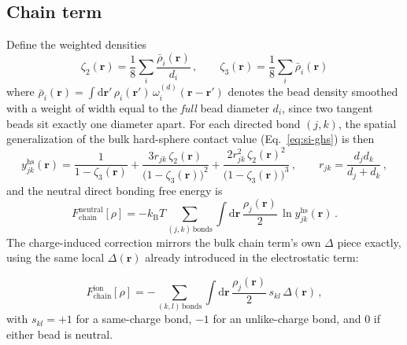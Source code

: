 \documentclass[journal=macl,manuscript=suppinfo,layout=onecolumn]{achemso}
\begin{document}
\subsection{Chain term}
\label{si:chain}
Define the weighted densities
\begin{equation}
    \zeta_2(\mathbf{r}) = \frac{1}{8}\sum_i \frac{\bar\rho_i(\mathbf{r})}{d_i}\,,\qquad
    \zeta_3(\mathbf{r}) = \frac{1}{8}\sum_i \bar\rho_i(\mathbf{r})
    \label{eq:si-zeta}
\end{equation}
where $\bar\rho_i(\mathbf{r})=\int\!\mathrm{d}\mathbf{r}'\,\rho_i(\mathbf{r}')\,\omega_i^{(d)}(\mathbf{r}-\mathbf{r}')$ denotes the bead density smoothed with a weight of width equal to the \emph{full} bead diameter $d_i$, since two tangent beads sit exactly one diameter apart. For each directed bond $(j,k)$, the spatial generalization of the bulk hard-sphere contact value (Eq.~\ref{eq:si-ghs}) is then
\begin{equation}
    y_{jk}^\mathrm{hs}(\mathbf{r}) = \frac{1}{1-\zeta_3(\mathbf{r})} + \frac{3r_{jk}\,\zeta_2(\mathbf{r})}{\big(1-\zeta_3(\mathbf{r})\big)^2} + \frac{2r_{jk}^2\,\zeta_2(\mathbf{r})^2}{\big(1-\zeta_3(\mathbf{r})\big)^3}\,,\qquad r_{jk}=\frac{d_jd_k}{d_j+d_k}\,,
    \label{eq:si-yhs}
\end{equation}
and the neutral direct bonding free energy is
\begin{equation}
    F_\mathrm{chain}^\mathrm{neutral}[\rho] = -k_\mathrm{B}T\!\!\sum_{(j,k)\,\mathrm{bonds}}\int\!\mathrm{d}\mathbf{r}\,\frac{\rho_j(\mathbf{r})}{2}\,\ln y_{jk}^\mathrm{hs}(\mathbf{r})\,.    \label{eq:si-fbondneutral}
\end{equation}
The charge-induced correction mirrors the bulk chain term's own $\Delta$ piece exactly, using the same local $\Delta(\mathbf{r})$ already introduced in the electrostatic term: 

\begin{equation}
   F_\mathrm{chain}^\mathrm{ion}[\rho]=-\sum_{(k,l)\,\mathrm{bonds}}\int\!\mathrm{d}\mathbf{r}\,\frac{\rho_j(\mathbf{r})}{2}\,s_{kl}\,\Delta(\mathbf{r})\,,
\end{equation} 
with $s_{kl}=+1$ for a same-charge bond, $-1$ for an unlike-charge bond, and $0$ if either bead is neutral.
\end{document}
